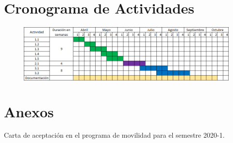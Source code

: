 \documentclass[11pt]{article}
\begin{document}
\section{Cronograma de Actividades}

\vspace{2mm}

\begin{figure}[h]
    \centering
    \includegraphics[width=1\linewidth]{Cronograma.PNG}
\label{Cronograma}
\end{figure}





\section{ Anexos}

Carta de aceptación en el programa de movilidad para el semestre 2020-1.

\end{document}
